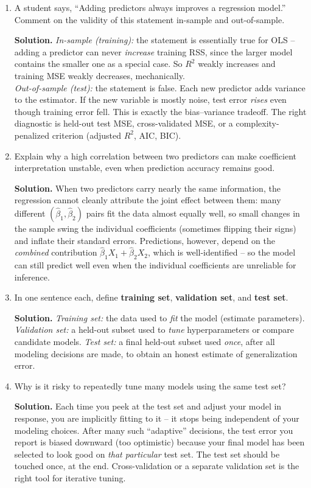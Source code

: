 \documentclass[11pt]{article}
\newcommand{\solution}[1]{%
  \par\medskip\noindent\textbf{Solution.} #1\par\medskip
}
\begin{document}
\begin{enumerate}[leftmargin=*]
\item A student says, ``Adding predictors always improves a regression model.'' Comment on the validity of this statement in-sample and out-of-sample.

\solution{\emph{In-sample (training):} the statement is essentially true for OLS -- adding a predictor can never \emph{increase} training RSS, since the larger model contains the smaller one as a special case. So $R^2$ weakly increases and training MSE weakly decreases, mechanically.\\
\emph{Out-of-sample (test):} the statement is false. Each new predictor adds variance to the estimator. If the new variable is mostly noise, test error \emph{rises} even though training error fell. This is exactly the bias--variance tradeoff. The right diagnostic is held-out test MSE, cross-validated MSE, or a complexity-penalized criterion (adjusted $R^2$, AIC, BIC).}

\item Explain why a high correlation between two predictors can make coefficient interpretation unstable, even when prediction accuracy remains good.

\solution{When two predictors carry nearly the same information, the regression cannot cleanly attribute the joint effect between them: many different $(\hat\beta_1, \hat\beta_2)$ pairs fit the data almost equally well, so small changes in the sample swing the individual coefficients (sometimes flipping their signs) and inflate their standard errors. Predictions, however, depend on the \emph{combined} contribution $\hat\beta_1 X_1 + \hat\beta_2 X_2$, which is well-identified -- so the model can still predict well even when the individual coefficients are unreliable for inference.}

\item In one sentence each, define \textbf{training set}, \textbf{validation set}, and \textbf{test set}.

\solution{\emph{Training set:} the data used to \emph{fit} the model (estimate parameters). \;
\emph{Validation set:} a held-out subset used to \emph{tune} hyperparameters or compare candidate models. \;
\emph{Test set:} a final held-out subset used \emph{once}, after all modeling decisions are made, to obtain an honest estimate of generalization error.}

\item Why is it risky to repeatedly tune many models using the same test set?

\solution{Each time you peek at the test set and adjust your model in response, you are implicitly fitting to it -- it stops being independent of your modeling choices. After many such ``adaptive'' decisions, the test error you report is biased downward (too optimistic) because your final model has been selected to look good on \emph{that particular} test set. The test set should be touched once, at the end. Cross-validation or a separate validation set is the right tool for iterative tuning.}


\end{enumerate}
\end{document}
